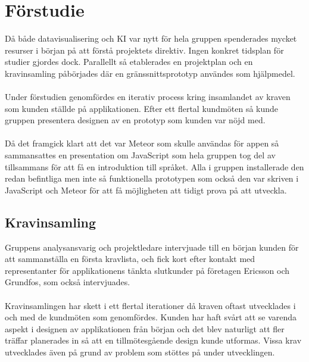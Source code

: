 \section{Förstudie}
\label{sec:pre-study}
Då både datavisualisering och KI var nytt för hela gruppen spenderades mycket resurser i
början på att förstå projektets direktiv. Ingen konkret tidsplan för studier gjordes dock.
Parallellt så etablerades en projektplan och en kravinsamling påbörjades där en
gränssnittsprototyp användes som hjälpmedel. 
\\ \\
Under förstudien genomfördes en iterativ process kring insamlandet av kraven som kunden ställde på applikationen.
Efter ett flertal kundmöten så kunde gruppen presentera designen av en prototyp som kunden var nöjd med.
\\\\
Då det framgick klart att det var Meteor som skulle användas för appen så sammansattes en presentation om JavaScript som hela gruppen tog del av tillsammans för att få en introduktion till språket. Alla i gruppen installerade den redan befintliga men inte så funktionella prototypen som också den var skriven i JavaScript och Meteor för att få möjligheten att tidigt prova på att utveckla.

\subsection{Kravinsamling}
Gruppens analysansvarig och projektledare intervjuade till en början kunden för att
sammanställa en första kravlista, och fick kort efter kontakt med representanter
för applikationens tänkta slutkunder på företagen Ericsson och Grundfos, som också intervjuades.
\\ \\
Kravinsamlingen har skett i ett flertal iterationer då kraven oftast utvecklades i och med de kundmöten som genomfördes.
Kunden har haft svårt att se varenda aspekt i designen av applikationen från början och det blev naturligt att fler träffar planerades in så att en tillmötesgående design kunde utformas. Vissa krav utvecklades även på grund av problem som stöttes på under utvecklingen.

